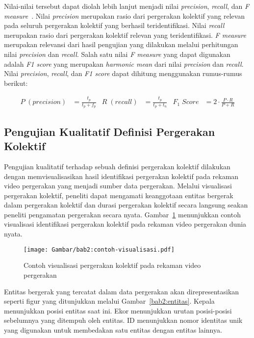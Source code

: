 Nilai-nilai tersebut dapat diolah lebih lanjut menjadi nilai \textit{precision}, \textit{recall}, dan \textit{F measure}~\cite{manning:02:ir}. Nilai \textit{precision} merupakan rasio dari pergerakan kolektif yang relevan pada seluruh pergerakan kolektif yang berhasil teridentifikasi. Nilai \textit{recall} merupakan rasio dari pergerakan kolektif relevan yang teridentifikasi. \textit{F measure} merupakan relevansi dari hasil pengujian yang dilakukan melalui perhitungan nilai \textit{precision} dan \textit{recall}. Salah satu nilai \textit{F measure} yang dapat digunakan adalah \textit{F1 score} yang merupakan \textit{harmonic mean} dari nilai \textit{precision} dan \textit{recall}. Nilai \textit{precision}, \textit{recall}, dan \textit{F1 score} dapat dihitung menggunakan rumus-rumus berikut:

\begin{align*}
    P\;(precision) & = \frac{t_p}{t_p + f_p} & R\;(recall) & = \frac{t_p}{t_p + t_n} & F_1\;Score & = 2 \cdot \frac{P \cdot R}{P + R}
\end{align*}

\subsection{Pengujian Kualitatif Definisi Pergerakan Kolektif}
\label{subsec:qualitative-theory}

Pengujian kualitatif terhadap sebuah definisi pergerakan kolektif dilakukan dengan memvisualisasikan hasil identifikasi pergerakan kolektif pada rekaman video pergerakan yang menjadi sumber data pergerakan. Melalui visualisasi pergerakan kolektif, peneliti dapat mengamati keanggotaan entitas bergerak dalam pergerakan kolektif dan durasi pergerakan kolektif secara langsung seakan peneliti pengamatan pergerakan secara nyata. Gambar~\ref{bab2:visualization} menunjukkan contoh visualisasi identifikasi pergerakan kolektif pada rekaman video pergerakan dunia nyata.

\begin{figure}[h]
    \centering
    \texttt{[image: Gambar/bab2:contoh-visualisasi.pdf]}
    \caption[Contoh visualisasi pergerakan kolektif]{Contoh visualisasi pergerakan kolektif pada rekaman video pergerakan}
    \label{bab2:visualization}
\end{figure}

Entitas bergerak yang tercatat dalam data pergerakan akan direpresentasikan seperti figur yang ditunjukkan melalui Gambar~\ref{bab2:entitas}. Kepala menunjukkan posisi entitas saat ini. Ekor menunjukkan urutan posisi-posisi sebelumnya yang ditempuh oleh entitas. ID menunjukkan nomor identitas unik yang digunakan untuk membedakan satu entitas dengan entitas lainnya.

